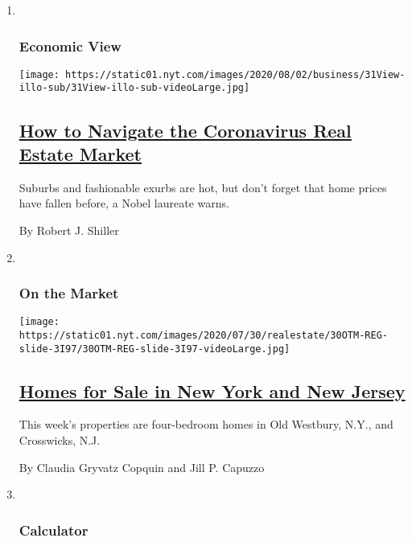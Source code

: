 \begin{enumerate}
\def\labelenumi{\arabic{enumi}.}
\item ~
  \hypertarget{economic-view}{%
  \subsubsection{Economic View}\label{economic-view}}

  \texttt{[image: https://static01.nyt.com/images/2020/08/02/business/31View-illo-sub/31View-illo-sub-videoLarge.jpg]}

  \hypertarget{how-to-navigate-the-coronavirus-real-estate-market}{%
  \subsection{\texorpdfstring{\href{/2020/07/31/business/housing-market-prices-risk.html}{How
  to Navigate the Coronavirus Real Estate
  Market}}{How to Navigate the Coronavirus Real Estate Market}}\label{how-to-navigate-the-coronavirus-real-estate-market}}

  Suburbs and fashionable exurbs are hot, but don't forget that home
  prices have fallen before, a Nobel laureate warns.

  By Robert J. Shiller
\item ~
  \hypertarget{on-the-market-1}{%
  \subsubsection{On the Market}\label{on-the-market-1}}

  \texttt{[image: https://static01.nyt.com/images/2020/07/30/realestate/30OTM-REG-slide-3I97/30OTM-REG-slide-3I97-videoLarge.jpg]}

  \hypertarget{homes-for-sale-in-new-york-and-new-jersey}{%
  \subsection{\texorpdfstring{\href{/2020/07/30/realestate/homes-for-sale-in-new-york-and-new-jersey.html}{Homes
  for Sale in New York and New
  Jersey}}{Homes for Sale in New York and New Jersey}}\label{homes-for-sale-in-new-york-and-new-jersey}}

  This week's properties are four-bedroom homes in Old Westbury, N.Y.,
  and Crosswicks, N.J.

  By Claudia Gryvatz Copquin and Jill P. Capuzzo
\item ~
  \hypertarget{calculator}{%
  \subsubsection{Calculator}\label{calculator}}


\end{enumerate}
